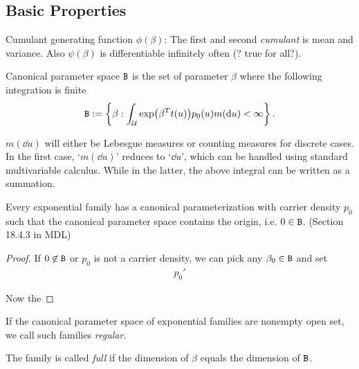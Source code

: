 
\subsection{Basic Properties}

Cumulant generating function $\phi(\beta)$: The first and second \emph{cumulant} is mean and variance.
Also $\psi(\beta)$ is differentiable infinitely often (? true for all?).

\begin{define}
    Canonical parameter space $\mathtt{B}$ is the set of parameter $\beta$ 
    where the following integration is finite
    \begin{align*}
        \Bt := \left\{\beta: \int_{\Uc} \exp(\beta^T t(u)) p_0(u)m(\dd{u}) <\infty \right\}.
    \end{align*}

        $m(\dd{u})$ will either be Lebesgue measures or counting measures for discrete cases.
        In the first case, `$m(\dd{u})$' reduces to `$\dd{u}$',
        which can be handled using standard multivariable calculus.
        While in the latter, the above integral can be 
        written as a summation.
\end{define}

\begin{remark}
    Every exponential family has a canonical parameterization with carrier density $p_0$
    such that the canonical parameter space contains the origin, i.e. $0 \in \mathtt{B}$. 
    (Section 18.4.3 in MDL)
\end{remark}

\begin{proof}
    If $0 \not\in \mathtt{B}$ or $p_0$ is not a carrier density, we can pick any $\beta_0 \in \mathtt{B}$ 
    and set 
    \begin{align*}
        p_0' 
    \end{align*}

    Now the 
\end{proof}

\begin{define}
    If the canonical parameter space of exponential families are nonempty open set, 
    we call such families \emph{regular}.
\end{define}

\begin{define}
    The family is called \emph{full} if the dimension of $\beta$ equals the dimension of $\mathtt{B}$.
\end{define}

